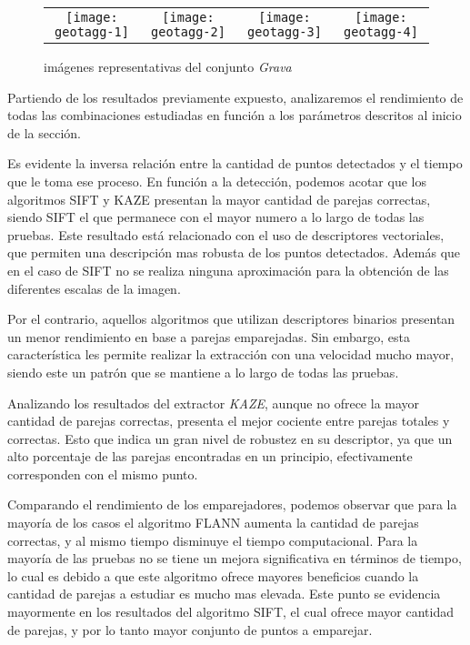 \begin{figure}[h]
	\centering
	\begin{tabular}{@{}cccc@{}}
		\texttt{[image: geotagg-1]} &
		\texttt{[image: geotagg-2]} &
		\texttt{[image: geotagg-3]} &
		\texttt{[image: geotagg-4]} 
	\end{tabular}
	\caption{imágenes representativas del conjunto \textit{Grava}}
	\label{imagen:geotag}
\end{figure}

Partiendo de los resultados previamente expuesto, analizaremos el rendimiento de todas las combinaciones estudiadas en función a los parámetros descritos al inicio de la sección.

Es evidente la inversa relación entre la cantidad de puntos detectados y el tiempo que le toma ese proceso. En función a la detección, podemos acotar que los algoritmos SIFT y KAZE presentan la mayor cantidad de parejas correctas, siendo SIFT el que permanece con el mayor numero a lo largo de todas las pruebas. Este resultado está relacionado con el uso de descriptores vectoriales, que permiten una descripción mas robusta de los puntos detectados. Además que en el caso de SIFT no se realiza ninguna aproximación para la obtención de las diferentes escalas de la imagen.

Por el contrario, aquellos algoritmos que utilizan descriptores binarios presentan un menor rendimiento en base a parejas emparejadas. Sin embargo, esta característica les permite realizar la extracción con una velocidad mucho mayor, siendo este un patrón que se mantiene a lo largo de todas las pruebas.

Analizando los resultados del extractor \textit{KAZE}, aunque no ofrece la mayor cantidad de parejas correctas, presenta el mejor cociente entre parejas totales y correctas. Esto que indica un gran nivel de robustez en su descriptor, ya que un alto porcentaje de las parejas encontradas en un principio, efectivamente corresponden con el mismo punto.

Comparando el rendimiento de los emparejadores, podemos observar que para la mayoría de los casos el algoritmo FLANN aumenta la cantidad de parejas correctas, y al mismo tiempo disminuye el tiempo computacional. Para la mayoría de las pruebas no se tiene un mejora significativa en términos de tiempo, lo cual es debido a que este algoritmo ofrece mayores beneficios cuando la cantidad de parejas a estudiar es mucho mas elevada. Este punto se evidencia mayormente en los resultados del algoritmo SIFT, el cual ofrece mayor cantidad de parejas, y por lo tanto mayor conjunto de puntos a emparejar.

